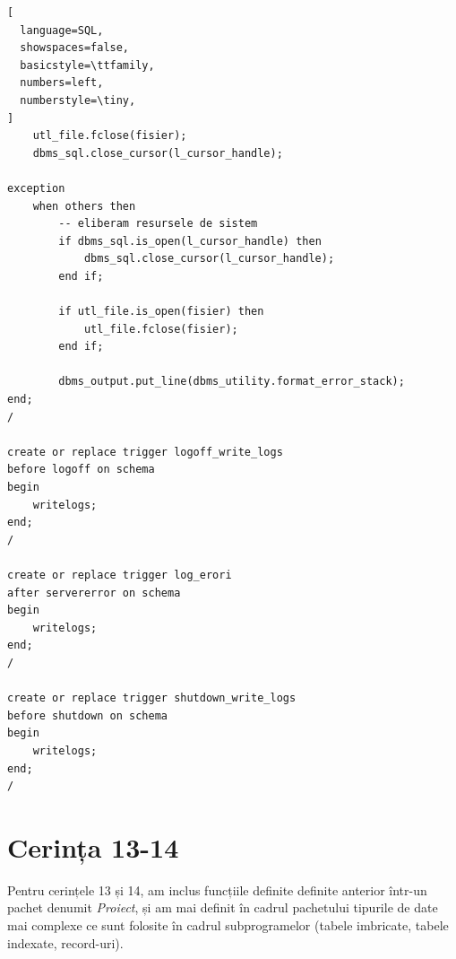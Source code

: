 \documentclass[12pt]{article}
\begin{document}
\begin{lstlisting}[
  language=SQL,
  showspaces=false,
  basicstyle=\ttfamily,
  numbers=left,
  numberstyle=\tiny,
]
    utl_file.fclose(fisier);
    dbms_sql.close_cursor(l_cursor_handle);
    
exception
    when others then
        -- eliberam resursele de sistem
        if dbms_sql.is_open(l_cursor_handle) then
            dbms_sql.close_cursor(l_cursor_handle);
        end if;
        
        if utl_file.is_open(fisier) then
            utl_file.fclose(fisier);
        end if;
        
        dbms_output.put_line(dbms_utility.format_error_stack);
end;
/

create or replace trigger logoff_write_logs
before logoff on schema
begin
    writelogs;
end;
/

create or replace trigger log_erori
after servererror on schema
begin
    writelogs;
end;
/

create or replace trigger shutdown_write_logs
before shutdown on schema
begin
    writelogs;
end;
/
\end{lstlisting}

\pagebreak

\section{Cerința 13-14}
Pentru cerințele 13 și 14, am inclus funcțiile definite definite anterior într-un pachet denumit
\textit{Proiect}, și am mai definit în cadrul pachetului tipurile de date mai complexe ce sunt folosite
în cadrul subprogramelor (tabele imbricate, tabele indexate, record-uri).

\vspace{0.5em}
\end{document}
